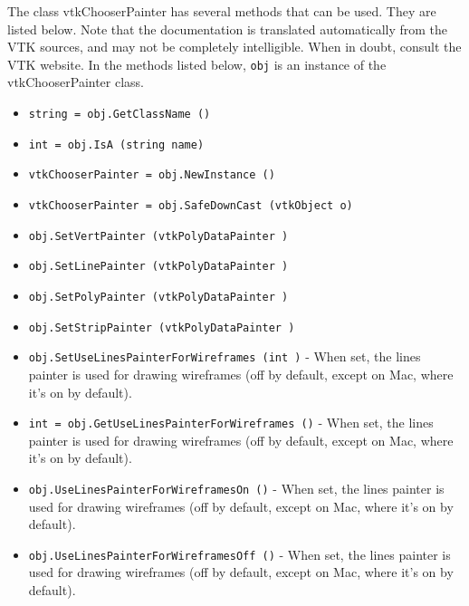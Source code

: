 The class vtkChooserPainter has several methods that can be used.
  They are listed below.
Note that the documentation is translated automatically from the VTK sources,
and may not be completely intelligible.  When in doubt, consult the VTK website.
In the methods listed below, \verb|obj| is an instance of the vtkChooserPainter class.
\begin{itemize}
\item  \verb|string = obj.GetClassName ()|

\item  \verb|int = obj.IsA (string name)|

\item  \verb|vtkChooserPainter = obj.NewInstance ()|

\item  \verb|vtkChooserPainter = obj.SafeDownCast (vtkObject o)|

\item  \verb|obj.SetVertPainter (vtkPolyDataPainter )|

\item  \verb|obj.SetLinePainter (vtkPolyDataPainter )|

\item  \verb|obj.SetPolyPainter (vtkPolyDataPainter )|

\item  \verb|obj.SetStripPainter (vtkPolyDataPainter )|

\item  \verb|obj.SetUseLinesPainterForWireframes (int )| -  When set, the lines painter is used for drawing wireframes (off by
 default, except on Mac, where it's on by default).

\item  \verb|int = obj.GetUseLinesPainterForWireframes ()| -  When set, the lines painter is used for drawing wireframes (off by
 default, except on Mac, where it's on by default).

\item  \verb|obj.UseLinesPainterForWireframesOn ()| -  When set, the lines painter is used for drawing wireframes (off by
 default, except on Mac, where it's on by default).

\item  \verb|obj.UseLinesPainterForWireframesOff ()| -  When set, the lines painter is used for drawing wireframes (off by
 default, except on Mac, where it's on by default).

\end{itemize}
